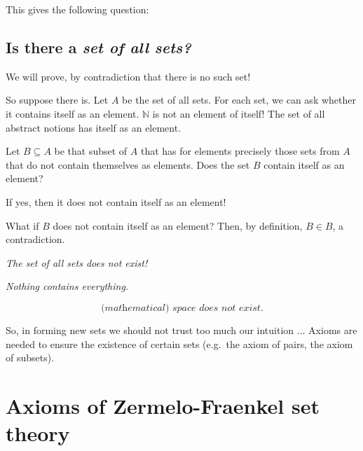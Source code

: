 \documentclass[11pt,paper=b5,footinclude,headinclude]{scrbook} %
\theoremstyle{remark}
\theoremstyle{definition} %
\theoremstyle{theorem} %
\begin{document}
This gives the following question:
\subsection*{Is there a {\em set of all sets?}}

We will prove, by contradiction that there is no such set!

So suppose there is. Let $ A $ be the set of all sets.
For each set, we can ask whether it contains itself as an element. $\mathbb{N} $ is not an element of itself!
The set of all abstract notions has itself as an element.

Let $B \subseteq A $ be that subset of $A$ that has for elements precisely those sets from $A$ that do not contain themselves as elements.
Does the set $B$ contain itself as an element?

If yes, then it does not contain itself as an element!

What if $ B $ does not contain itself as an element? Then, by definition, $ B \in B $, a contradiction.

{\em The set of all sets does not exist!}

{\centerline \em Nothing contains everything.}

$$ \textit{(mathematical) space does not exist.}$$

So, in forming new sets we should not trust too much our intuition ...
Axioms are needed to ensure the existence of certain sets (e.g.~the axiom of pairs, the axiom of subsets).

\section{Axioms of Zermelo-Fraenkel set theory}
\end{document}
